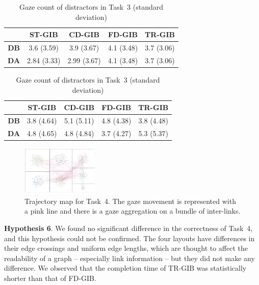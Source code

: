 \documentclass[review]{vgtc}                 %
\begin{document}
\begin{table}[b]
  \begin{center}
   \caption{Gaze count of distractors in Task~2 (standard deviation)}
  \label{table-dist2}
    \begin{tabular}{|c|c|c|c|c|} \hline
      & ST-GIB & CD-GIB & FD-GIB & TR-GIB \\ \hline
      {\bf DB} & 3.6 (3.59) & 3.9 (3.67) & 4.1 (3.48) & 3.7 (3.06) \\ \hline
      {\bf DA}  & 2.84 (3.33) & 2.99 (3.67) & 4.1 (3.48) & 3.7 (3.06) \\ \hline
    \end{tabular}
  \end{center}
  \begin{center}
   \caption{Gaze count of distractors in Task~3 (standard deviation)}
  \label{table-dist3}
    \begin{tabular}{|c|c|c|c|c|} \hline
      & ST-GIB & CD-GIB & FD-GIB & TR-GIB \\ \hline
      {\bf DB} & 3.8 (4.64) & 5.1 (5.11) & 4.8 (4.38) & 3.8 (4.48) \\ \hline
      {\bf DA} & 4.8 (4.65) & 4.8 (4.84) & 3.7 (4.27) & 5.3 (5.37) \\ \hline
    \end{tabular}
  \end{center}
\end{table}


\begin{figure}[t]
  \begin{center}
    \includegraphics[width=0.33\textwidth]{pictures/concentration.png}
    \caption{Trajectory map for Task~4. The gaze movement is represented with a pink line and there is a gaze aggregation on a bundle of inter-links.}
    \label{concent}
  \end{center}
\end{figure}

{\bf Hypothesis 6}. We found no significant difference in the correctness of Task~4, and this hypothesis could not be confirmed.
The four layouts have differences in their edge crossings and uniform edge lengths, which are thought to affect the readability of a graph -- especially link information -- but they did not make any difference.
We observed that the completion time of TR-GIB was statistically shorter than that of FD-GIB.
\end{document}

